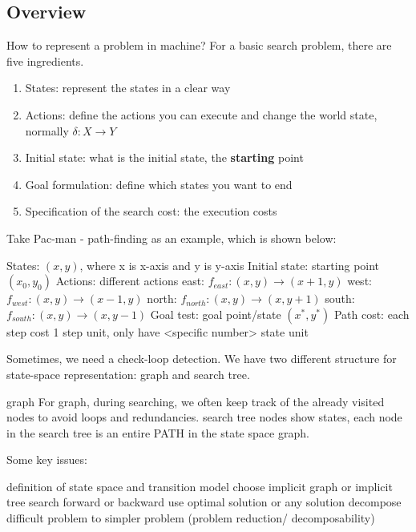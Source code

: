 \subsection{Overview}
How to represent a problem in machine? For a basic search problem, there are five ingredients.
\begin{enumerate}
    \item States: represent the states in a clear way
    \item Actions: define the actions you can execute and change the world state, normally $\delta: X \rightarrow Y$
    \item Initial state: what is the initial state, the \textbf{starting} point
    \item Goal formulation: define which states you want to end
    \item Specification of the search cost: the execution costs
\end{enumerate} 

\noindent
Take Pac-man - path-finding as an example, which is shown below:
\begin{outline}
    \1 States: $(x,y)$, where x is x-axis and y is y-axis
    \1 Initial state: starting point $(x_{0},y_{0})$
    \1 Actions: different actions
        \2 east: $f_{east}: (x,y) \rightarrow (x+1,y)$
        \2 west: $f_{west}: (x,y) \rightarrow (x-1,y)$
        \2 north: $f_{north}: (x,y) \rightarrow (x,y+1)$
        \2 south: $f_{south}: (x,y) \rightarrow (x,y-1)$
    \1 Goal test: goal point/state $(x^{*},y^{*})$
    \1 Path cost: each step cost 1 step unit, only have <specific number> state unit
\end{outline}

\noindent
Sometimes, we need a check-loop detection. We have two different structure for state-space representation: graph and search tree.
\begin{outline}
    \1 graph
        \2 For graph, during searching, we often keep track of the already visited nodes to avoid loops and redundancies.
    \1 search tree
        \2 nodes show states, each node in the search tree is an entire PATH in the state space graph.
\end{outline}

\noindent
Some key issues:
\begin{outline}
    \1 definition of state space and transition model
    \1 choose implicit graph or implicit tree
    \1 search forward or backward
    \1 use optimal solution or any solution
    \1 decompose difficult problem to simpler problem (problem reduction/ decomposability)
\end{outline}

